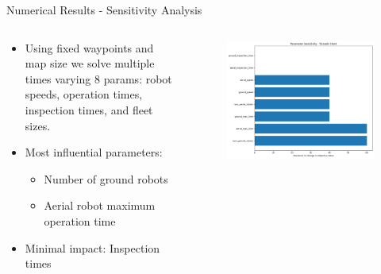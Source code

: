 \documentclass[aspectratio=169,11pt,xcolor={dvipsnames},hyperref={pdftex,pdfpagemode=UseNone,hidelinks,pdfdisplaydoctitle=true},usepdftitle=false]{beamer}
\begin{document}
    \begin{frame}{Numerical Results - Sensitivity Analysis}
    \begin{columns}[c]
      \begin{column}{0.48\textwidth}
        \begin{itemize}
          \item Using fixed waypoints and map size we solve multiple times varying 8 params: robot speeds, operation times, inspection times, and fleet sizes.
          \item Most influential parameters:
            \begin{itemize}
              \item Number of ground robots
              \item Aerial robot maximum operation time
            \end{itemize}
          \item Minimal impact: Inspection times
        \end{itemize}
      \end{column}
      
      \begin{column}{0.48\textwidth}
        \begin{figure}
          \includegraphics[width=\textwidth]{figures/tornado_chart.pdf}
        \end{figure}
      \end{column}
    \end{columns}
  \end{frame}
\end{document}
